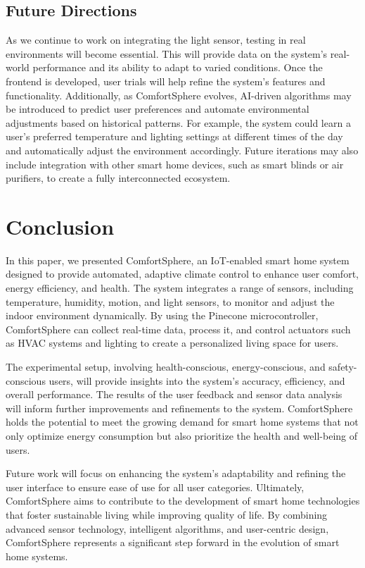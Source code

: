 \documentclass[a4paper]{scrartcl}
\begin{document}
\subsection{Future Directions}  
As we continue to work on integrating the light sensor, testing in real environments will become essential. This will provide data on the system’s real-world performance and its ability to adapt to varied conditions. Once the frontend is developed, user trials will help refine the system’s features and functionality. Additionally, as ComfortSphere evolves, AI-driven algorithms may be introduced to predict user preferences and automate environmental adjustments based on historical patterns. For example, the system could learn a user's preferred temperature and lighting settings at different times of the day and automatically adjust the environment accordingly. Future iterations may also include integration with other smart home devices, such as smart blinds or air purifiers, to create a fully interconnected ecosystem.

\section{Conclusion}
\label{sec:conclusion}
In this paper, we presented ComfortSphere, an IoT-enabled smart home system designed to provide automated, adaptive climate control to enhance user comfort, energy efficiency, and health. The system integrates a range of sensors, including temperature, humidity, motion, and light sensors, to monitor and adjust the indoor environment dynamically. By using the Pinecone microcontroller, ComfortSphere can collect real-time data, process it, and control actuators such as HVAC systems and lighting to create a personalized living space for users.

The experimental setup, involving health-conscious, energy-conscious, and safety-conscious users, will provide insights into the system's accuracy, efficiency, and overall performance. The results of the user feedback and sensor data analysis will inform further improvements and refinements to the system. ComfortSphere holds the potential to meet the growing demand for smart home systems that not only optimize energy consumption but also prioritize the health and well-being of users.

Future work will focus on enhancing the system's adaptability and refining the user interface to ensure ease of use for all user categories. Ultimately, ComfortSphere aims to contribute to the development of smart home technologies that foster sustainable living while improving quality of life. By combining advanced sensor technology, intelligent algorithms, and user-centric design, ComfortSphere represents a significant step forward in the evolution of smart home systems.

	\printbibliography[title={References}]
\end{document}
